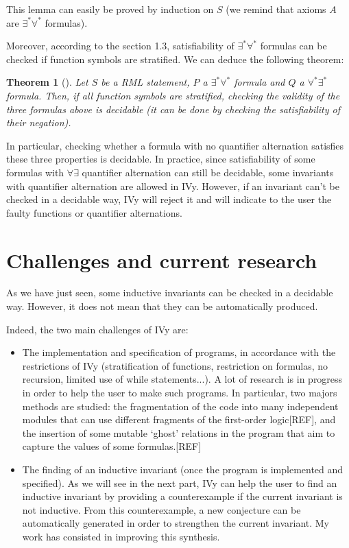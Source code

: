 \documentclass[11pt,a4paper,oldfontcommands,openany]{memoir}
\newtheorem*{theorem}{Theorem}
\begin{document}
    This lemma can easily be proved by induction on \(S\) (we remind that axioms \(A\) are \(\exists^*\forall^*\) formulas).
    
    Moreover, according to the section 1.3, satisfiability of \(\exists^*\forall^*\) formulas can be checked if function symbols are stratified.
    We can deduce the following theorem:

    \begin{theorem}[]
        Let \(S\) be a RML statement, \(P\) a \(\exists^*\forall^*\) formula and \(Q\) a \(\forall^*\exists^*\) formula.
        Then, if all function symbols are stratified, checking the validity of the three formulas above is decidable
        (it can be done by checking the satisfiability of their negation).
    \end{theorem}

    In particular, checking whether a formula with no quantifier alternation satisfies these three properties is decidable.
    In practice, since satisfiability of some formulas with \( \forall\exists \) quantifier alternation can still be decidable,
    some invariants with quantifier alternation are allowed in IVy. However, if an invariant can't be checked in a decidable way, IVy will reject it
    and will indicate to the user the faulty functions or quantifier alternations.

    \section{Challenges and current research}

    As we have just seen, some inductive invariants can be checked in a decidable way.
    However, it does not mean that they can be automatically produced.

    Indeed, the two main challenges of IVy are:
    \begin{itemize}
        \item The implementation and specification of programs, in accordance with the restrictions of IVy
        (stratification of functions, restriction on formulas, no recursion, limited use of while statements...).
        A lot of research is in progress in order to help the user to make such programs. In particular, two majors methods are
        studied: the fragmentation of the code into many independent modules that can use different fragments of the first-order logic[REF],
        and the insertion of some mutable `ghost' relations in the program that aim to capture the values of some formulas.[REF]
        
        \item The finding of an inductive invariant (once the program is implemented and specified). As we will see in the next part,
        IVy can help the user to find an inductive invariant by providing a counterexample if the current invariant is not inductive.
        From this counterexample, a new conjecture can be automatically generated in order to strengthen the current invariant.
        My work has consisted in improving this synthesis.
    \end{itemize}
\end{document}
